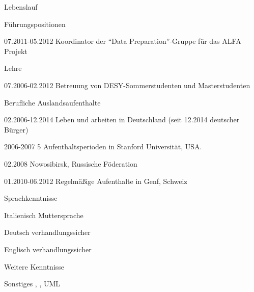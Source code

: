\documentclass[11pt,a4paper]{scrartcl}
\newcommand{\versal}[1]{\textsf{\textsmaller{\MakeUppercase{\caps{#1}}}}\xspace}
\newcommand*{\ac}[1]{\versal{#1}}
\begin{document}
\begin{cv}{Lebenslauf}
\begin{cvlist}{F\"uhrungspositionen}
\item [07.2011-05.2012] Koordinator der "`Data Preparation"'-Gruppe
f\"ur das ALFA Projekt
\end{cvlist}

\begin{cvlist}{Lehre}
\item [07.2006-02.2012] Betreuung von DESY-Sommerstudenten und
Masterstudenten
\end{cvlist}

\begin{cvlist}{Berufliche Auslandsaufenthalte}
\item [02.2006-12.2014] Leben und arbeiten in Deutschland (seit 12.2014
deutscher B{\"u}rger)
\item [2006-2007] 5 Aufenthaltsperioden in Stanford Universit\"at, USA.
\item [02.2008] Nowosibirsk, Russische F\"oderation
\item [01.2010-06.2012] Regelm\"a{\ss}ige Aufenthalte in Genf, Schweiz
\end{cvlist}

\begin{cvlist}{Sprachkenntnisse}
\item [Italienisch] Muttersprache
\item [Deutsch] verhandlungssicher
\item [Englisch] verhandlungssicher
\end{cvlist}

\begin{cvlist}{Weitere \ac{EDV} Kenntnisse}
\item[Sonstiges] \ac{MS OFFICE}, \ac{\LaTeX}, UML
\end{cvlist}



\end{cv}
\end{document}
